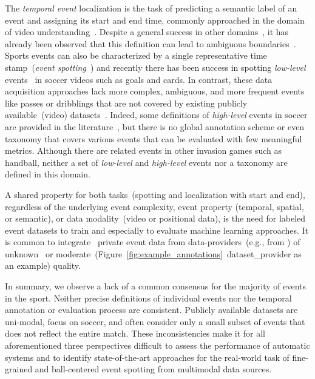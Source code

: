 The \textit{temporal event} localization is the task of predicting a semantic label of an event and assigning its start and end time, commonly approached in the domain of video understanding~\cite{caba2015activitynet}.  
Despite a general success in other domains~\cite{lin2019bmn, feichtenhofer2019slowfast, caba2015activitynet, nguyen2018weakly}, it has already been observed that this definition can lead to ambiguous boundaries~\cite{sigurdsson2017actions}.
Sports events can also be characterized by a single representative time stamp~(\emph{event spotting}~\cite{giancola2018soccernet}) and recently there has been success in spotting \textit{low-level} events~\cite{giancola2021temporally, deliege2020soccernet, cioppa2020context} in soccer videos such as goals and cards. 
In contrast, these data acquisition approaches lack more complex, ambiguous, and more frequent events like passes or dribblings that are not covered by existing publicly available~(video) datasets~\cite{feng2020sset, deliege2020soccernet}. Indeed, some definitions of \textit{high-level} events in soccer are provided in the literature~\cite{kim2019attacking, fernandes2019design}, but there is no global annotation scheme or even taxonomy that covers various events that can be evaluated with few meaningful metrics.
Although there are related events in other invasion games such as handball, neither a set of \textit{low-level} and \textit{high-level} events nor a taxonomy are defined in this domain.

A shared property for both tasks~(spotting and localization with start and end), regardless of the underlying event complexity, event property (temporal, spatial, or semantic), or data modality~(video or positional data), is the need for labeled event datasets to train and especially to evaluate machine learning approaches.
It is common to integrate~\cite{sanford2020group, fernandez2020soccermap} private event data from data-providers~(e.g., from \cite{wyscout, opta, stats}) of unknown~\cite{liu2013reliability} or moderate~(Figure~\ref{fig:example_annotations}~\acrshort{dataset_provider} as an example) quality.

In summary, we observe a lack of a common consensus for the majority of events in the sport.
Neither precise definitions of individual events nor the temporal annotation or evaluation process are consistent. 
Publicly available datasets are uni-modal, focus on soccer, and often consider only a small subset of events that does not reflect the entire match.
These inconsistencies make it for all aforementioned three perspectives difficult to assess the performance of automatic systems and to identify state-of-the-art approaches for the real-world task of fine-grained and ball-centered event spotting from multimodal data sources.

